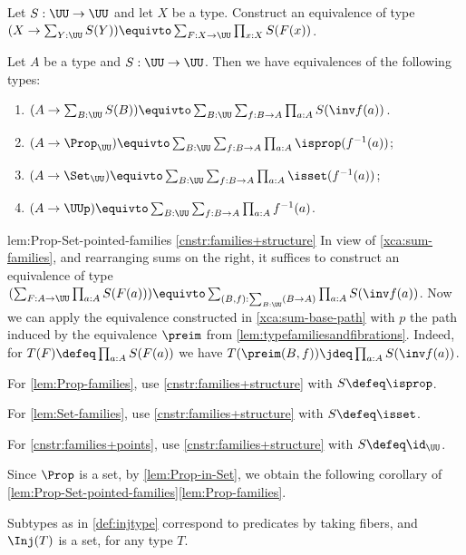 \begin{xca}\label{xca:sum-families}
Let $S: \UU\to\UU$ and let $X$ be a type.
Construct an equivalence of type
$(X\to\sum_{Y:\UU} S(Y)) \equivto \sum_{F:X\to\UU}\prod_{x:X}S(F(x))$.
\end{xca}

\begin{construction}\label{lem:Prop-Set-pointed-families}
Let $A$ be a type and $S:\UU\to\UU$.
Then we have equivalences of the following types:
\begin{enumerate}
\item\label{cnstr:families+structure}
$(A\to\sum_{B:\UU}S(B)) \equivto
\sum_{B:\UU}\sum_{f:B\to A}\prod_{a:A}S(\inv f(a))$.
\item\label{lem:Prop-families}
$(A\to\Prop_\UU) \equivto \sum_{B:\UU}\sum_{f:B\to A}
\prod_{a:A}\isprop({f^{-1}(a)})$;
\item\label{lem:Set-families}
$(A\to\Set_\UU) \equivto \sum_{B:\UU}\sum_{f:B\to A}
\prod_{a:A}\isset({f^{-1}(a)})$;
\item\label{cnstr:families+points}
$(A\to\UUp) \equivto \sum_{B:\UU}\sum_{f:B\to A}\prod_{a:A}f^{-1}(a)$.
\end{enumerate}
\end{construction}

\begin{implementation}{lem:Prop-Set-pointed-families}
\ref{cnstr:families+structure}
In view of \cref{xca:sum-families}, and rearranging sums on the right,
it suffices to construct an equivalence of type
$(\sum_{F:A\to\UU}\prod_{a:A}S(F(a))) \equivto
\sum_{(B,f):\sum_{B:\UU}(B\to A)}\prod_{a:A}S(\inv f(a))$.
Now we can apply the equivalence constructed in \cref{xca:sum-base-path}
with $p$ the path induced by the equivalence $\preim$ from
\cref{lem:typefamiliesandfibrations}. Indeed,
for $T(F)\defeq \prod_{a:A}S(F(a))$ we have
$T(\preim(B,f))\jdeq \prod_{a:A}S(\inv f (a))$.

For \ref{lem:Prop-families}, use \ref{cnstr:families+structure}
with $S\defeq \isprop$.

For \ref{lem:Set-families}, use \ref{cnstr:families+structure}
with $S\defeq \isset$.

For \ref{cnstr:families+points}, use \ref{cnstr:families+structure}
with $S\defeq \id_\UU$.
\end{implementation}

Since $\Prop$ is a set, by \cref{lem:Prop-in-Set}, 
we obtain the following corollary
of \cref{lem:Prop-Set-pointed-families}\ref{lem:Prop-families}.
\begin{corollary}\label{cor:Inj(T)-is-set}
  Subtypes as in \cref{def:injtype} correspond to predicates
  by taking fibers, and $\Inj(T)$ is a set, for any type $T$.
\end{corollary}

